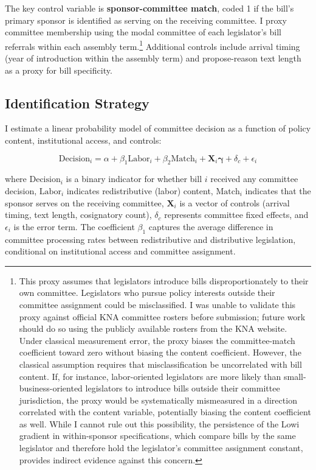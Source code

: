 \documentclass[11pt]{article}
\begin{document}
The key control variable is \textbf{sponsor-committee match}, coded 1 if the bill's primary sponsor is identified as serving on the receiving committee. I proxy committee membership using the modal committee of each legislator's bill referrals within each assembly term.\footnote{This proxy assumes that legislators introduce bills disproportionately to their own committee. Legislators who pursue policy interests outside their committee assignment could be misclassified. I was unable to validate this proxy against official KNA committee rosters before submission; future work should do so using the publicly available rosters from the KNA website. Under classical measurement error, the proxy biases the committee-match coefficient toward zero without biasing the content coefficient. However, the classical assumption requires that misclassification be uncorrelated with bill content. If, for instance, labor-oriented legislators are more likely than small-business-oriented legislators to introduce bills outside their committee jurisdiction, the proxy would be systematically mismeasured in a direction correlated with the content variable, potentially biasing the content coefficient as well. While I cannot rule out this possibility, the persistence of the Lowi gradient in within-sponsor specifications, which compare bills by the same legislator and therefore hold the legislator's committee assignment constant, provides indirect evidence against this concern.} Additional controls include arrival timing (year of introduction within the assembly term) and propose-reason text length as a proxy for bill specificity.

\subsection{Identification Strategy}
\label{sec:ident}

I estimate a linear probability model of committee decision as a function of policy content, institutional access, and controls:

\begin{equation}
\text{Decision}_i = \alpha + \beta_1 \text{Labor}_i + \beta_2 \text{Match}_i + \mathbf{X}_i \boldsymbol{\gamma} + \delta_c + \epsilon_i
\label{eq:main}
\end{equation}

\noindent where $\text{Decision}_i$ is a binary indicator for whether bill $i$ received any committee decision, $\text{Labor}_i$ indicates redistributive (labor) content, $\text{Match}_i$ indicates that the sponsor serves on the receiving committee, $\mathbf{X}_i$ is a vector of controls (arrival timing, text length, cosignatory count), $\delta_c$ represents committee fixed effects, and $\epsilon_i$ is the error term. The coefficient $\beta_1$ captures the average difference in committee processing rates between redistributive and distributive legislation, conditional on institutional access and committee assignment.
\end{document}
